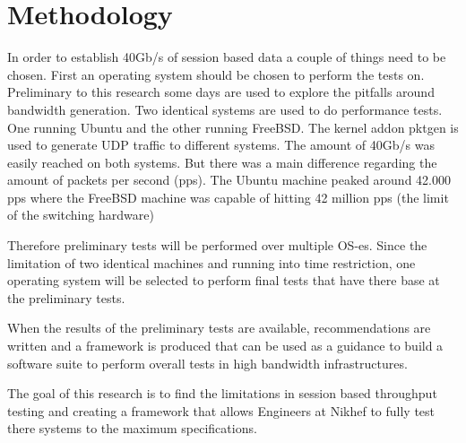 \section{Methodology}
In order to establish 40Gb/s of session based data a couple of things need to be chosen.
First an operating system should be chosen to perform the tests on. Preliminary to this research some days are used to explore the pitfalls around bandwidth generation. Two identical systems are used to do performance tests.
One running Ubuntu and the other running FreeBSD. 
The kernel addon pktgen is used to generate UDP traffic to different systems. The amount of 40Gb/s was easily reached on both systems.
But there was a main difference regarding the amount of packets per second (pps). The Ubuntu machine peaked around 42.000 pps where the FreeBSD machine was capable of hitting 42 million pps (the limit of the switching hardware)

Therefore preliminary tests will be performed over multiple OS-es. Since the limitation of two identical machines and running into time restriction, one operating system will be selected to perform final tests that have there base at the preliminary tests.

When the results of the preliminary tests are available, recommendations are written and a framework is produced that can be used as a guidance to build a software suite to perform overall tests in high bandwidth infrastructures.

The goal of this research is to find the limitations in session based throughput testing and creating a framework that allows Engineers at Nikhef to fully test there systems to the maximum specifications. 
